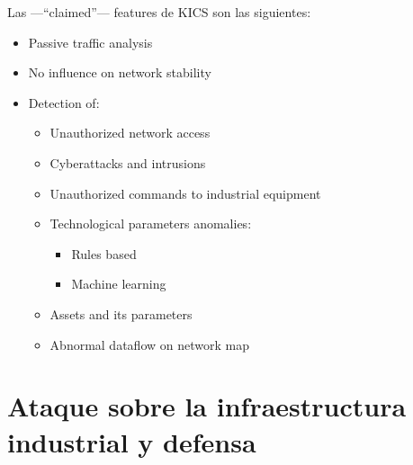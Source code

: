 Las ---``claimed''--- features de KICS son las siguientes:
\begin{itemize}
	\item Passive traffic analysis
	\item No influence on network stability
	\item Detection of:
	\begin{itemize}
      \item Unauthorized network access
      \item Cyberattacks and intrusions
      \item Unauthorized commands to industrial equipment
      \item Technological parameters anomalies:
      \begin{itemize}
       	\item Rules based
	      \item Machine learning
      \end{itemize}
      \item Assets and its parameters
      \item Abnormal dataflow on network map
   \end{itemize}
\end{itemize}

\section{Ataque sobre la infraestructura industrial y defensa}

